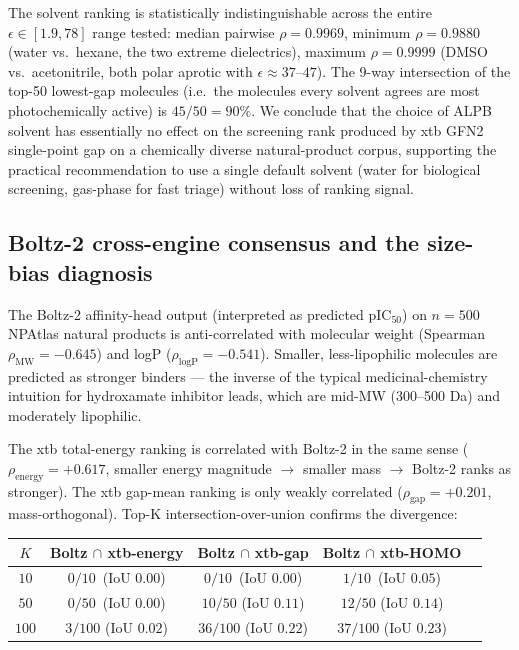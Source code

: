 \documentclass[11pt,a4paper]{article}
\begin{document}
The solvent ranking is statistically indistinguishable across the
entire $\epsilon \in [1.9, 78]$ range tested: median pairwise
$\rho = 0.9969$, minimum $\rho = 0.9880$ (water vs.\ hexane, the
two extreme dielectrics), maximum $\rho = 0.9999$ (DMSO vs.\
acetonitrile, both polar aprotic with $\epsilon \approx 37$--$47$).
The 9-way intersection of the top-50 lowest-gap molecules
(i.e.\ the molecules every solvent agrees are most photochemically
active) is $45/50 = 90\%$. We conclude that the choice of ALPB
solvent has essentially no effect on the screening rank produced by
xtb GFN2 single-point gap on a chemically diverse natural-product
corpus, supporting the practical recommendation to use a single
default solvent (water for biological screening, gas-phase for fast
triage) without loss of ranking signal.

\subsection{Boltz-2 cross-engine consensus and the size-bias diagnosis}
\label{sec:results-boltz}

The Boltz-2 affinity-head output (interpreted as predicted pIC$_{50}$)
on $n = 500$ NPAtlas natural products is anti-correlated with
molecular weight (Spearman $\rho_{\mathrm{MW}} = -0.645$) and logP
($\rho_{\mathrm{logP}} = -0.541$). Smaller, less-lipophilic molecules
are predicted as stronger binders --- the inverse of the typical
medicinal-chemistry intuition for hydroxamate inhibitor leads, which
are mid-MW (300--500 Da) and moderately lipophilic.

The xtb total-energy ranking is correlated with Boltz-2 in the same
sense ($\rho_{\mathrm{energy}} = +0.617$, smaller energy magnitude
$\to$ smaller mass $\to$ Boltz-2 ranks as stronger). The xtb
gap-mean ranking is only weakly correlated
($\rho_{\mathrm{gap}} = +0.201$, mass-orthogonal). Top-K
intersection-over-union confirms the divergence:

\begin{center}
\small
\begin{tabular}{ccccc}
\toprule
$K$ & Boltz $\cap$ xtb-energy & Boltz $\cap$ xtb-gap & Boltz $\cap$ xtb-HOMO \\
\midrule
$10$  & $0/10$ \,(IoU $0.00$)  & $0/10$ \,(IoU $0.00$)  & $1/10$ \,(IoU $0.05$) \\
$50$  & $0/50$ \,(IoU $0.00$)  & $10/50$ (IoU $0.11$)   & $12/50$ (IoU $0.14$) \\
$100$ & $3/100$ (IoU $0.02$)   & $36/100$ (IoU $0.22$)  & $37/100$ (IoU $0.23$) \\
\bottomrule
\end{tabular}
\end{center}
\end{document}
